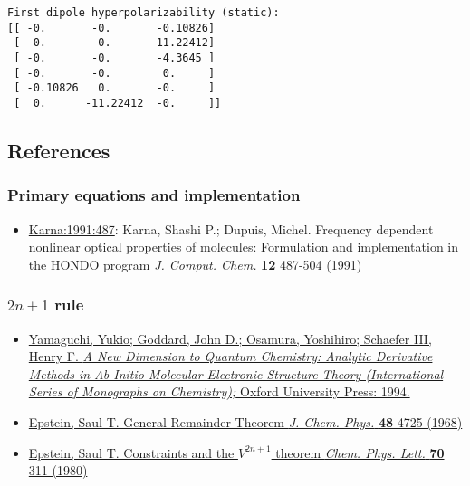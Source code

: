 \documentclass[]{article}
\providecommand{\tightlist}{%
  \setlength{\itemsep}{0pt}\setlength{\parskip}{0pt}}
\begin{document}
\begin{lstlisting}
First dipole hyperpolarizability (static):
[[ -0.       -0.       -0.10826]
 [ -0.       -0.      -11.22412]
 [ -0.       -0.       -4.3645 ]
 [ -0.       -0.        0.     ]
 [ -0.10826   0.       -0.     ]
 [  0.      -11.22412  -0.     ]]
\end{lstlisting}

\hypertarget{references}{%
\subsection{References}\label{references}}

\hypertarget{primary-equations-and-implementation}{%
\subsubsection{Primary equations and
implementation}\label{primary-equations-and-implementation}}

\begin{itemize}
\tightlist
\item
  \href{https://dx.doi.org/10.1002/jcc.540120409}{Karna:1991:487}:
  Karna, Shashi P.; Dupuis, Michel. Frequency dependent nonlinear
  optical properties of molecules: Formulation and implementation in the
  HONDO program \emph{J. Comput. Chem.} \textbf{12} 487-504 (1991)
\end{itemize}

\hypertarget{n-1-rule}{%
\subsubsection{\texorpdfstring{\(2n + 1\)
rule}{2n + 1 rule}}\label{n-1-rule}}

\begin{itemize}
\tightlist
\item
  \href{https://isbnsearch.org/isbn/9780195070286}{Yamaguchi, Yukio;
  Goddard, John D.; Osamura, Yoshihiro; Schaefer III, Henry F. \emph{A
  New Dimension to Quantum Chemistry: Analytic Derivative Methods in Ab
  Initio Molecular Electronic Structure Theory (International Series of
  Monographs on Chemistry);} Oxford University Press: 1994.}
\item
  \href{https://dx.doi.org/10.1063/1.1668053}{Epstein, Saul T. General
  Remainder Theorem \emph{J. Chem. Phys.} \textbf{48} 4725 (1968)}
\item
  \href{https://dx.doi.org/10.1016/0009-2614(80)85340-1}{Epstein, Saul
  T. Constraints and the \(V^{2n+1}\) theorem \emph{Chem. Phys. Lett.}
  \textbf{70} 311 (1980)}
\end{itemize}
\end{document}
